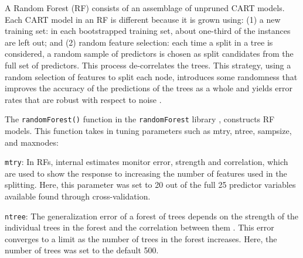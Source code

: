 A Random Forest (RF) consists of an assemblage of unpruned CART models. Each CART model in an RF is different because it is grown using: (1) a new training set: in each bootstrapped training set, about one-third of the instances are left out; and (2) random feature selection: each time a split in a tree is considered, a random sample of predictors is chosen as split candidates from the full set of predictors. This process de-correlates the trees. 
This strategy, using a random selection of features to split each node, introduces some randomness that improves the accuracy of the predictions of the trees as a whole and yields error rates that are robust with respect to noise \cite{breiman2001random}.

%

The {\tt randomForest()} function in the {\tt randomForest} library \cite{liaw2002classification}, constructs RF models. This function takes in tuning parameters such as mtry, ntree, sampsize, and maxnodes:

{\tt mtry}: In RFs, internal estimates monitor error, strength and correlation, which are used to show the response to increasing the number of features used in the splitting. Here, this parameter was set to 20 out of the full 25 predictor variables available found through cross-validation.

{\tt ntree}: The generalization error of a forest of trees depends on the strength of the individual trees in the forest and the correlation between them \cite{breiman2001random}. This error converges to a limit as the number of trees in the forest increases. Here, the number of trees was set to the default 500. 

